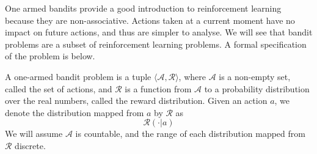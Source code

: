 \documentclass{report}
\begin{document}
One armed bandits provide a good introduction to reinforcement learning because they are non-associative. Actions taken at a current moment have no impact on future actions, and thus are simpler to analyse. We will see that bandit problems are a subset of reinforcement learning problems. A formal specification of the problem is below.

A one-armed bandit problem is a tuple $\langle \mathcal{A}, \mathcal{R} \rangle$, where $\mathcal{A}$ is a non-empty set, called the set of actions, and $\mathcal{R}$ is a function from $\mathcal{A}$ to a probability distribution over the real numbers, called the reward distribution. Given an action $a$, we denote the distribution mapped from $a$ by $\mathcal{R}$ as
%
\[ \mathcal{R}(\cdotp|a) \]
%
\noindent We will assume $\mathcal{A}$ is countable, and the range of each distribution mapped from $\mathcal{R}$ discrete.
\end{document}
